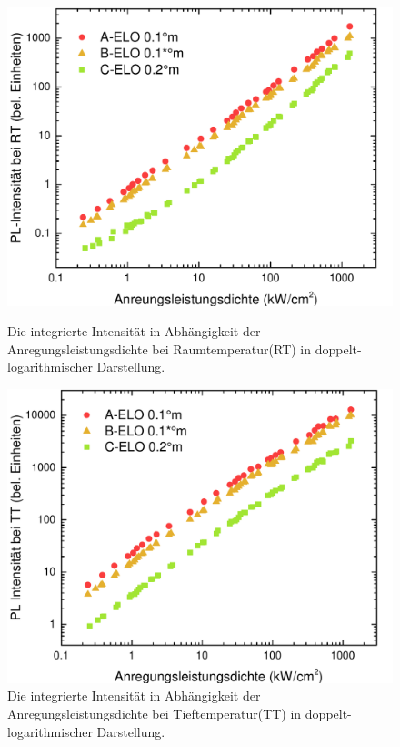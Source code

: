 \begin{figure}[ht]
  \centering
  \begin{minipage}[t]{0.49\textwidth}
    \centering
    \includegraphics[width=\textwidth]{Bilder/TS4045/intRT.pdf}
		\caption{Die integrierte Intensität in Abhängigkeit der Anregungsleistungsdichte bei Raumtemperatur(RT) in doppelt-logarithmischer Darstellung.}
    \label{fig:eloINTrt}
  \end{minipage}
	\hfill
  \begin{minipage}[t]{0.49\textwidth}
    \centering
    \includegraphics[width=\linewidth]{Bilder/TS4045/intTT.pdf}
		\caption{Die integrierte Intensität in Abhängigkeit der Anregungsleistungsdichte bei Tieftemperatur(TT) in doppelt-logarithmischer Darstellung.}
    \label{fig:eloINTtt}
  \end{minipage}
\end{figure}
